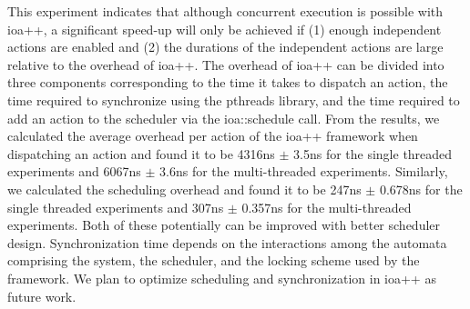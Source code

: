 This experiment indicates that although concurrent execution is possible with ioa++, a significant speed-up will only be achieved if (1) enough independent actions are enabled and (2) the durations of the independent actions are large relative to the overhead of ioa++.
The overhead of ioa++ can be divided into three components corresponding to the time it takes to dispatch an action, the time required to synchronize using the pthreads library, and the time required to add an action to the scheduler via the ioa::schedule call.
From the results, we calculated the average overhead per action of the ioa++ framework when dispatching an action and found it to be 4316ns $\pm$ 3.5ns for the single threaded experiments and 6067ns $\pm$ 3.6ns for the multi-threaded experiments.
Similarly, we calculated the scheduling overhead and found it to be 247ns $\pm$ 0.678ns for the single threaded experiments and 307ns $\pm$ 0.357ns for the multi-threaded experiments.
Both of these potentially can be improved with better scheduler design.
Synchronization time depends on the interactions among the automata comprising the system, the scheduler, and the locking scheme used by the framework.
We plan to optimize scheduling and synchronization in ioa++ as future work.
